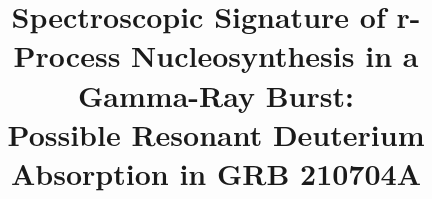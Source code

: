 \documentclass[linenumbers,twocolumn]{aastex631}
\begin{document}
\title{
Spectroscopic Signature of r-Process Nucleosynthesis in a Gamma-Ray Burst: \\ Possible Resonant Deuterium Absorption in GRB 210704A
}


\end{document}
